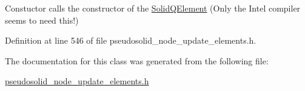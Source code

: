 Constuctor calls the constructor of the \hyperlink{classoomph_1_1SolidQElement}{Solid\+Q\+Element} (Only the Intel compiler seems to need this!) 



Definition at line 546 of file pseudosolid\+\_\+node\+\_\+update\+\_\+elements.\+h.



The documentation for this class was generated from the following file\+:\begin{DoxyCompactItemize}
\item 
\hyperlink{pseudosolid__node__update__elements_8h}{pseudosolid\+\_\+node\+\_\+update\+\_\+elements.\+h}\end{DoxyCompactItemize}
